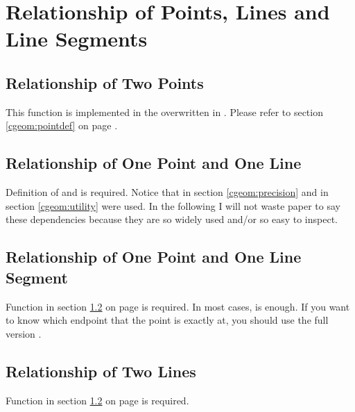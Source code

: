 
\section{Relationship of Points, Lines and Line Segments}

\subsection{Relationship of Two Points}

This function is implemented in the overwritten  in
. Please refer to section \ref{cgeom:pointdef} on page
\pageref{cgeom:pointdef}.

\subsection{Relationship of One Point and One Line}
\label{cgeom:relpl}

Definition of  and  is required. Notice that
 in section \ref{cgeom:precision} and  in section
\ref{cgeom:utility} were used. In the following I will not waste paper to say
these dependencies because they are so widely used and/or so easy to inspect.



\subsection{Relationship of One Point and One Line Segment}

Function  in section \ref{cgeom:relpl} on page
\pageref{cgeom:relpl} is required. In most cases,  is
enough. If you want to know which endpoint that the point is exactly at, you
should use the full version .



\subsection{Relationship of Two Lines}

Function  in section \ref{cgeom:relpl} on page
\pageref{cgeom:relpl} is required.



